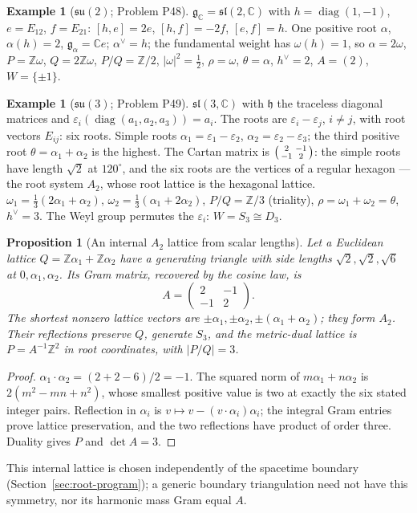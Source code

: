 \documentclass[11pt]{article}
\newtheorem{proposition}[theorem]{Proposition}
\theoremstyle{definition}
\newtheorem{example}[theorem]{Example}
\theoremstyle{remark}
\newcommand{\Z}{\mathbb{Z}}
\newcommand{\C}{\mathbb{C}}
\begin{document}
\begin{example}[$\mathfrak{su}(2)$; Problem P48]\label{ex:sl2}
$\mathfrak g_\C = \mathfrak{sl}(2,\C)$ with $h = \operatorname{diag}(1,-1)$,
$e = E_{12}$, $f = E_{21}$: $[h,e] = 2e$, $[h,f] = -2f$, $[e,f] = h$. One
positive root $\alpha$, $\alpha(h) = 2$, $\mathfrak g_\alpha = \C e$;
$\alpha^\vee = h$; the fundamental weight has $\omega(h) = 1$, so
$\alpha = 2\omega$, $P = \Z\omega$, $Q = 2\Z\omega$, $P/Q = \Z/2$,
$|\omega|^2 = \tfrac12$, $\rho = \omega$, $\theta = \alpha$, $h^\vee = 2$,
$A = (2)$, $W = \{\pm1\}$.
\end{example}

\begin{example}[$\mathfrak{su}(3)$; Problem P49]\label{ex:sl3}
$\mathfrak{sl}(3,\C)$ with $\mathfrak h$ the traceless diagonal matrices
and $\varepsilon_i(\operatorname{diag}(a_1,a_2,a_3)) = a_i$. The roots are
$\varepsilon_i-\varepsilon_j$, $i\ne j$, with root vectors $E_{ij}$: six
roots. Simple roots $\alpha_1 = \varepsilon_1-\varepsilon_2$,
$\alpha_2 = \varepsilon_2-\varepsilon_3$; the third positive root
$\theta = \alpha_1+\alpha_2$ is the highest. The Cartan matrix is
$\begin{psmallmatrix}2&-1\\-1&2\end{psmallmatrix}$: the simple roots have
length $\sqrt2$ at $120^\circ$, and the six roots are the vertices of a
regular hexagon --- the root system $A_2$, whose root lattice is the
hexagonal lattice. $\omega_1 = \tfrac13(2\alpha_1+\alpha_2)$,
$\omega_2 = \tfrac13(\alpha_1+2\alpha_2)$, $P/Q = \Z/3$ (triality),
$\rho = \omega_1+\omega_2 = \theta$, $h^\vee = 3$. The Weyl group permutes
the $\varepsilon_i$: $W = S_3\cong D_3$.
\end{example}

\begin{proposition}[An internal $A_2$ lattice from scalar lengths]\label{prop:scalar-a2}
Let a Euclidean lattice $Q=\Z\alpha_1+\Z\alpha_2$ have a generating
triangle with side lengths $\sqrt2,\sqrt2,\sqrt6$ at
$0,\alpha_1,\alpha_2$. Its Gram matrix, recovered by the cosine law, is
\[
 A=\begin{pmatrix}2&-1\\-1&2\end{pmatrix}.
\]
The shortest nonzero lattice vectors are
$\pm\alpha_1,\pm\alpha_2,\pm(\alpha_1+\alpha_2)$; they form $A_2$.
Their reflections preserve $Q$, generate $S_3$, and the metric-dual
lattice is $P=A^{-1}\Z^2$ in root coordinates, with $|P/Q|=3$.
\end{proposition}
\begin{proof}
$\alpha_1\cdot\alpha_2=(2+2-6)/2=-1$. The squared norm of
$m\alpha_1+n\alpha_2$ is $2(m^2-mn+n^2)$, whose smallest positive
value is two at exactly the six stated integer pairs. Reflection in
$\alpha_i$ is $v\mapsto v-(v\cdot\alpha_i)\alpha_i$; the integral
Gram entries prove lattice preservation, and the two reflections have
product of order three. Duality gives $P$ and $\det A=3$.
\end{proof}
This internal lattice is chosen independently of the spacetime boundary
(Section~\ref{sec:root-program}); a generic boundary triangulation need
not have this symmetry, nor its harmonic mass Gram equal $A$.
\end{document}
